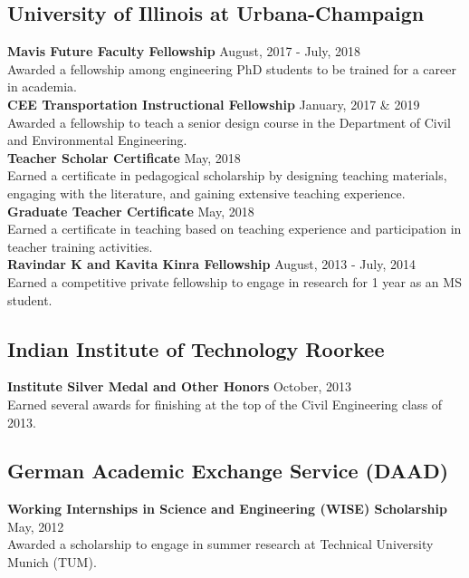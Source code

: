 \documentclass[12pt]{article}
\begin{document}
\subsection*{University of Illinois at Urbana-Champaign} 
\textbf{Mavis Future Faculty Fellowship} \hfill August, 2017 - July, 2018 \\
Awarded a fellowship among engineering PhD students to be trained for a career in academia. \\

\textbf{CEE Transportation Instructional Fellowship} \hfill January, 2017 \& 2019 \\
Awarded a fellowship to teach a senior design course in the Department of Civil and Environmental Engineering. \\

\textbf{Teacher Scholar Certificate} \hfill May, 2018 \\
Earned a certificate in pedagogical scholarship by designing teaching materials, engaging with the literature, and gaining extensive teaching experience. \\

\textbf{Graduate Teacher Certificate} \hfill May, 2018 \\
Earned a certificate in teaching based on teaching experience and participation in teacher training activities. \\

\textbf{Ravindar K and Kavita Kinra Fellowship} \hfill August, 2013 - July, 2014 \\
Earned a competitive private fellowship to engage in research for 1 year as an MS student. \\

\subsection*{Indian Institute of Technology Roorkee} 
\textbf{Institute Silver Medal and Other Honors} \hfill October, 2013 \\
Earned several awards for finishing at the top of the Civil Engineering class of 2013. \\

\subsection*{German Academic Exchange Service (DAAD)}
\textbf{Working Internships in Science and Engineering (WISE) Scholarship} \hfill May, 2012 \\
Awarded a scholarship to engage in summer research at Technical University Munich (TUM). 
\end{document}
